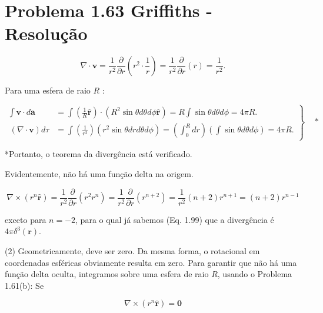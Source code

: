 \documentclass[a4paper,12pt]{article}
\begin{document}
\section*{Problema 1.63 Griffiths - Resolu\c{c}\~ao}

\begin{equation}
    \nabla \cdot \mathbf{v}=\frac{1}{r^{2}} \frac{\partial}{\partial r}\left(r^{2} \cdot \frac{1}{r}\right)=\frac{1}{r^{2}} \frac{\partial}{\partial r}(r)=\frac{1}{r^{2}} .
\end{equation}
    
Para uma esfera de raio $R$ :

\begin{equation}
\left.\begin{array}{rl}
\int \mathbf{v} \cdot d \mathbf{a} & =\int\left(\frac{1}{R} \hat{\mathbf{r}}\right) \cdot\left(R^{2} \sin \theta d \theta d \phi \hat{\mathbf{r}}\right)=R \int \sin \theta d \theta d \phi=4 \pi R . \\\
(\nabla \cdot \mathbf{v}) d \tau & =\int\left(\frac{1}{r^{2}}\right)\left(r^{2} \sin \theta d r d \theta d \phi\right)=\left(\int_{0}^{R} d r\right)\left(\int \sin \theta d \theta d \phi\right)=4 \pi R .
\end{array}\right\} \begin{aligned}
& {*}\\
& 
\end{aligned}
\end{equation}

*Portanto, o teorema da divergência está verificado.

Evidentemente, não há uma função delta na origem.

\begin{equation}
\nabla \times\left(r^{n} \hat{\mathbf{r}}\right)=\frac{1}{r^{2}} \frac{\partial}{\partial r}\left(r^{2} r^{n}\right)=\frac{1}{r^{2}} \frac{\partial}{\partial r}\left(r^{n+2}\right)=\frac{1}{r^{2}}(n+2) r^{n+1}=(n+2) r^{n-1}
\end{equation}

exceto para $n=-2$, para o qual já sabemos (Eq. 1.99) que a divergência é $4 \pi \delta^{3}(\mathbf{r})$.

(2) Geometricamente, deve ser zero. Da mesma forma, o rotacional em coordenadas esféricas obviamente resulta em zero. 
Para garantir que não há uma função delta oculta, integramos sobre uma esfera de raio $R$, usando o Problema 1.61(b): 
Se 

\begin{equation}
    \nabla \times\left(r^{n} \hat{\mathbf{r}}\right)=\mathbf{0}
\end{equation}
\end{document}
